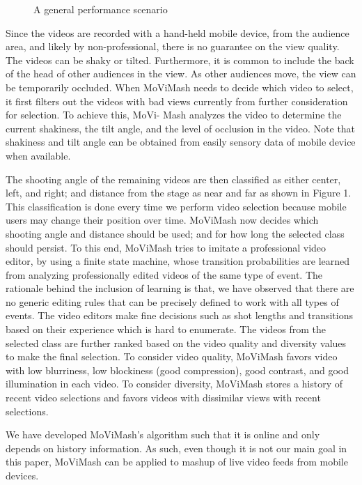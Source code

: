 \documentclass{sig-alternate}
\begin{document}
\begin{figure}
\centering
{}
\caption{A general performance scenario}
\end{figure}

Since the videos are recorded with a hand-held mobile device,
from the audience area, and likely by non-professional, there is no
guarantee on the view quality. The videos can be shaky or tilted.
Furthermore, it is common to include the back of the head of other
audiences in the view. As other audiences move, the view can be
temporarily occluded. When MoViMash needs to decide which
video to select, it first filters out the videos with bad views currently
from further consideration for selection. To achieve this, MoVi-
Mash analyzes the video to determine the current shakiness, the tilt
angle, and the level of occlusion in the video. Note that shakiness and tilt angle can be obtained from easily sensory data of mobile
device when available.

The shooting angle of the remaining videos are then classified as
either center, left, and right; and distance from the stage as near and
far as shown in Figure 1. This classification is done every time we
perform video selection because mobile users may change their position
over time. MoViMash now decides which shooting angle and
distance should be used; and for how long the selected class should
persist. To this end, MoViMash tries to imitate a professional video
editor, by using a finite state machine, whose transition probabilities
are learned from analyzing professionally edited videos of the
same type of event. The rationale behind the inclusion of learning
is that, we have observed that there are no generic editing rules
that can be precisely defined to work with all types of events. The
video editors make fine decisions such as shot lengths and transitions
based on their experience which is hard to enumerate.
The videos from the selected class are further ranked based on
the video quality and diversity values to make the final selection.
To consider video quality, MoViMash favors video with low blurriness,
low blockiness (good compression), good contrast, and good
illumination in each video. To consider diversity, MoViMash stores
a history of recent video selections and favors videos with dissimilar
views with recent selections.

We have developed MoViMash’s algorithm such that it is online
and only depends on history information. As such, even though
it is not our main goal in this paper, MoViMash can be applied to
mashup of live video feeds from mobile devices.
\end{document}
